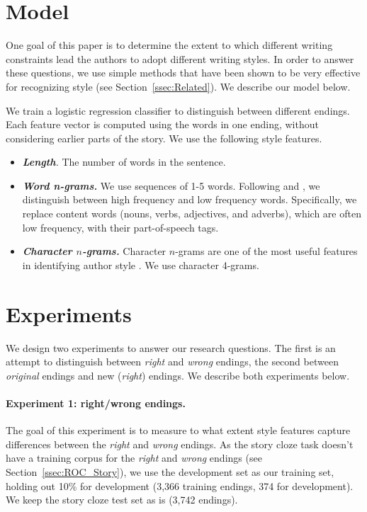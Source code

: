 \documentclass[11pt,a4paper]{article}
\newcommand{\secref}[1]{Section~\ref{ssec:#1}}
\newcommand{\isectionb}[1]{\section{#1}\label{ssec:#1}}
\begin{document}
\isectionb{Model}

One goal of this paper is to determine the extent to which 
different writing constraints lead the authors to adopt different writing styles. 
In order to answer these questions, we use simple methods that have been shown to be very effective for recognizing style (see \secref{Related}).
We describe our model below.

We train a logistic regression classifier to distinguish between different endings. 
Each feature vector is computed using the words in one ending, without considering earlier parts of the story. 
We use the following style features.

\begin{itemize}
\item\textit{\textbf{Length}.} The number of words in the sentence.
\item\textit{\textbf{Word n-grams.}} We use sequences of 1-5
  words. Following \citet{Tsur:2010} and \citet{Schwartz:2013}, we distinguish between high frequency and low frequency words. 
Specifically, we replace content words (nouns, verbs, adjectives, and adverbs), which are often low frequency, with their part-of-speech tags.
\item\textit{\textbf{Character $n$-grams.}} Character $n$-grams are one of the most useful features in identifying author style \cite{Stamatatos:2009}. 
We use character 4-grams.
\end{itemize}

\isectionb{Experiments}
We design two experiments to answer our research questions. 
The first is an attempt to distinguish between {\it right} and {\it wrong} endings,
the second  between {\it original} endings and new ({\it right}) endings.
We describe both experiments below.

\paragraph{Experiment 1: right/wrong endings.}
The goal of this experiment is to measure to what extent  style features capture differences between the {\it right} and {\it wrong} endings.
As the story cloze task doesn't have a training corpus for the {\it
  right} and {\it wrong} endings (see \secref{ROC_Story}), we use the
development set as our training set, holding out 10\% for development
(3,366 training endings, 374 for development). 
 We keep the story cloze test set as is (3,742 endings).
\end{document}
